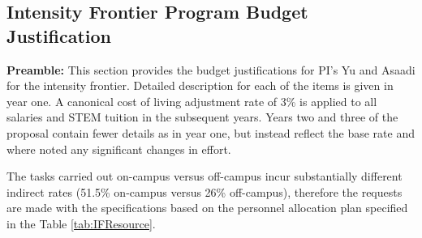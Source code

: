 \subsection{\Large Intensity Frontier Program Budget Justification}
{\bf Preamble:} This section provides the budget justifications for PI’s Yu and Asaadi for the intensity frontier.  Detailed description for each of the items is given in year one.  A canonical cost of living adjustment rate of 3\% is applied to all salaries and STEM tuition in the subsequent years. Years two and three of the proposal contain fewer details as in year one, but instead reflect the base rate and where noted any significant changes in effort.   

The tasks carried out on-campus versus off-campus incur substantially different indirect rates (51.5\% on-campus versus 26\% off-campus), therefore the requests are made with the specifications based on the personnel allocation plan specified in the Table \ref{tab:IFResource}.  

